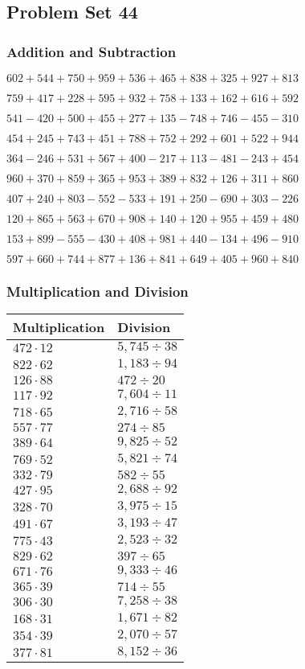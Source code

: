 \hypertarget{problem-set-44-1}{%
\subsection{Problem Set 44}\label{problem-set-44-1}}

\hypertarget{addition-and-subtraction-144}{%
\subsubsection{Addition and
Subtraction}\label{addition-and-subtraction-144}}

\(602 + 544 + 750 + 959 + 536 + 465 + 838 + 325 + 927 + 813\)

\(759 + 417 + 228 + 595 + 932 + 758 + 133 + 162 + 616 + 592\)

\(541 - 420 + 500 + 455 + 277 + 135 - 748 + 746 - 455 - 310\)

\(454 + 245 + 743 + 451 + 788 + 752 + 292 + 601 + 522 + 944\)

\(364 - 246 + 531 + 567 + 400 - 217 + 113 - 481 - 243 + 454\)

\(960 + 370 + 859 + 365 + 953 + 389 + 832 + 126 + 311 + 860\)

\(407 + 240 + 803 - 552 - 533 + 191 + 250 - 690 + 303 - 226\)

\(120 + 865 + 563 + 670 + 908 + 140 + 120 + 955 + 459 + 480\)

\(153 + 899 - 555 - 430 + 408 + 981 + 440 - 134 + 496 - 910\)

\(597 + 660 + 744 + 877 + 136 + 841 + 649 + 405 + 960 + 840\)

\hypertarget{multiplication-and-division-144}{%
\subsubsection{Multiplication and
Division}\label{multiplication-and-division-144}}

\begin{longtable}[]{@{}ll@{}}
\toprule
Multiplication & Division\tabularnewline
\midrule
\endhead
\(472 \cdot 12\) & \(5,745÷38\)\tabularnewline
\(822 \cdot 62\) & \(1,183÷94\)\tabularnewline
\(126 \cdot 88\) & \(472÷20\)\tabularnewline
\(117 \cdot 92\) & \(7,604÷11\)\tabularnewline
\(718 \cdot 65\) & \(2,716÷58\)\tabularnewline
\(557 \cdot 77\) & \(274÷85\)\tabularnewline
\(389 \cdot 64\) & \(9,825÷52\)\tabularnewline
\(769 \cdot 52\) & \(5,821÷74\)\tabularnewline
\(332 \cdot 79\) & \(582÷55\)\tabularnewline
\(427 \cdot 95\) & \(2,688÷92\)\tabularnewline
\(328 \cdot 70\) & \(3,975÷15\)\tabularnewline
\(491 \cdot 67\) & \(3,193÷47\)\tabularnewline
\(775 \cdot 43\) & \(2,523÷32\)\tabularnewline
\(829 \cdot 62\) & \(397÷65\)\tabularnewline
\(671 \cdot 76\) & \(9,333÷46\)\tabularnewline
\(365 \cdot 39\) & \(714÷55\)\tabularnewline
\(306 \cdot 30\) & \(7,258÷38\)\tabularnewline
\(168 \cdot 31\) & \(1,671÷82\)\tabularnewline
\(354 \cdot 39\) & \(2,070÷57\)\tabularnewline
\(377 \cdot 81\) & \(8,152÷36\)\tabularnewline
\bottomrule
\end{longtable}

